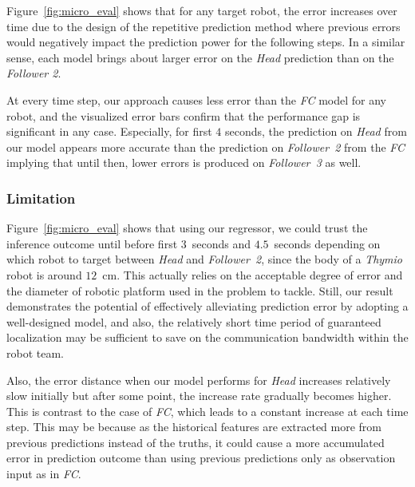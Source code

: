 \documentclass[letterpaper, 10 pt, conference]{ieeeconf}  %
\begin{document}
	Figure~\ref{fig:micro_eval} shows that for any target robot, the error increases over time due to the 
	design of the repetitive prediction method where previous errors would negatively 
	impact the prediction power for the following steps. In a similar sense, each model 
	brings about larger error on the \emph{Head} prediction than on the \emph{Follower 2}. 
	
	At every time step, our approach causes less error than the \emph{FC} model for any robot, and  
    the visualized error bars confirm that the performance gap is significant in any case.  
    Especially, for first $4$ seconds, the prediction on \emph{Head} from our model appears 
    more accurate than the prediction on \emph{Follower~2} from the \emph{FC} implying that 
    until then, lower errors is produced on \emph{Follower~3} as well. 
    
    \subsubsection{Limitation} 
	\label{sec:limitation}
	
	Figure~\ref{fig:micro_eval} shows that using our regressor, we could trust the inference 
	outcome until before first $3$~seconds and $4.5$~seconds depending on which robot to target between 
	\emph{Head} and \emph{Follower~2}, since the body of a \emph{Thymio} robot is around 
	$12$~cm. This actually relies on the acceptable degree of error and the diameter of 
	robotic platform used in the problem to tackle. Still, our result demonstrates the potential 
	of effectively alleviating prediction error by adopting a well-designed model, and also, 
	the relatively short time period of guaranteed localization may be sufficient to 
	save on the communication bandwidth within the robot team. 
	
	Also, the error distance when our model performs for \emph{Head} increases relatively slow 
	initially but after some point, the increase rate gradually becomes higher. This is contrast to the 
	case of \emph{FC}, which leads to a constant increase at each time step.  
	This may be because as the historical features are extracted more from previous predictions 
	instead of the truths, it could cause a more accumulated error in prediction outcome than 
	using previous predictions only as observation input as in \emph{FC}.
	
\end{document}
